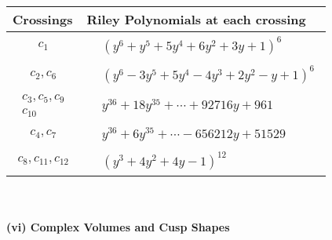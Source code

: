\documentclass[1p]{elsarticle_modified}
\theoremstyle{definition}
\begin{document}
\begin{tabular}{m{50pt}|m{274pt}}
Crossings & \hspace{64pt}Riley Polynomials at each crossing \\
\hline $$\begin{aligned}c_{1}\end{aligned}$$&$\begin{aligned}
&(y^6+y^5+5 y^4+6 y^2+3 y+1)^6
\end{aligned}$\\
\hline $$\begin{aligned}c_{2},c_{6}\end{aligned}$$&$\begin{aligned}
&(y^6-3 y^5+5 y^4-4 y^3+2 y^2- y+1)^6
\end{aligned}$\\
\hline $$\begin{aligned}c_{3},c_{5},c_{9}\\c_{10}\end{aligned}$$&$\begin{aligned}
&y^{36}+18 y^{35}+\cdots+92716 y+961
\end{aligned}$\\
\hline $$\begin{aligned}c_{4},c_{7}\end{aligned}$$&$\begin{aligned}
&y^{36}+6 y^{35}+\cdots-656212 y+51529
\end{aligned}$\\
\hline $$\begin{aligned}c_{8},c_{11},c_{12}\end{aligned}$$&$\begin{aligned}
&(y^3+4 y^2+4 y-1)^{12}
\end{aligned}$\\
\hline
\end{tabular}\\~\\
\newpage\flushleft \textbf{(vi) Complex Volumes and Cusp Shapes}
\end{document}
